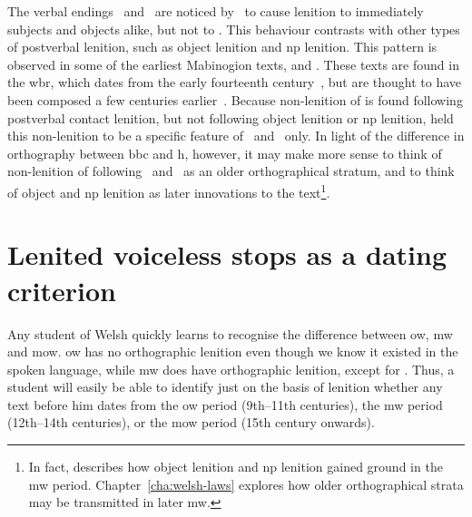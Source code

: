 The verbal endings \ei\ and \oes\ are noticed by~\textcite{van_development14} to cause lenition to immediately subjects and objects alike, but not to . This behaviour contrasts with other types of postverbal lenition, such as object lenition and \gls{np} lenition. This pattern is observed in some of the earliest Mabinogion texts, \ie {} and . These texts are found in the \gls{wbr}, which dates from the early fourteenth century~, but are thought to have been composed a few centuries earlier~. Because non-lenition of  is found following postverbal contact lenition, but not following object lenition or \gls{np} lenition, \textcite{van_development14} held this non-lenition to be a specific feature of \ei\ and \oes\ only. In light of the difference in orthography between \gls{bbc} and \gls{h}, however, it may make more sense to think of non-lenition of  following \ei\ and \oes\ as an older orthographical stratum, and to think of object and \gls{np} lenition as later innovations to the text\footnote{In fact, \textcite{van_development14} describes how object lenition and \gls{np} lenition gained ground in the \gls{mw} period. Chapter~\ref{cha:welsh-laws} explores how older orthographical strata may be transmitted in later \gls{mw}.}.

\section{Lenited voiceless stops as a dating criterion}
\label{sec:lenit-voic-stops-1}
Any student of Welsh quickly learns to recognise the difference between \gls{ow}, \gls{mw} and \gls{mow}. \Gls{ow} has no orthographic lenition even though we know it existed in the spoken language, while \gls{mw} does have orthographic lenition, except for . Thus, a student will easily be able to identify just on the basis of lenition whether any text before him dates from the \gls{ow} period (9th--11th centuries), the \gls{mw} period (12th--14th centuries), or the \gls{mow} period (15th century onwards).


